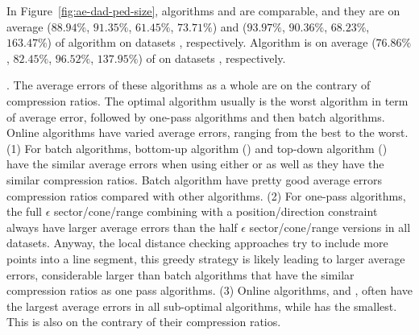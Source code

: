 %
In Figure~\ref{fig:ae-dad-ped-size}, algorithms \tpa and \interval are comparable, and they are on average
{($88.94\%$, $91.35\%$, $61.45\%$, $73.71\%$) and ($93.97\%$, $90.36\%$, $68.23\%$, $163.47\%$)} of algorithm \opt on datasets \dSets, respectively.
Algorithm \dpa is on average ($76.86\%$, $82.45\%$, $96.52\%$, $137.95\%$) of \opt on datasets \dSets, respectively.




. The average errors of these algorithms as a whole are on the contrary of compression ratios. The optimal algorithm usually is the worst algorithm in term of average error, followed by one-pass algorithms and then batch algorithms.
Online algorithms have varied average errors, ranging from the best to the worst.
(1) For batch algorithms, bottom-up algorithm (\tpa) and top-down algorithm (\dpa) have the similar average errors when using either \ped or \sed as well as they have the similar compression ratios. Batch algorithm have pretty good average errors \wrt compression ratios compared with other algorithms. \todo{\dad}
%
(2) For one-pass algorithms, the full $\epsilon$ sector/cone/range combining with a position/direction constraint always have larger average errors than the half $\epsilon$ sector/cone/range versions in all datasets. Anyway, the local distance checking approaches try to include more points into a line segment, this greedy strategy is likely leading to larger average errors, considerable larger than batch algorithms that have the similar compression ratios as one pass algorithms.
%
(3) Online algorithms, \bqsa and \opwa, often have the largest average errors in all sub-optimal algorithms, while \squishe has the smallest. This is also on the contrary of their compression ratios.



